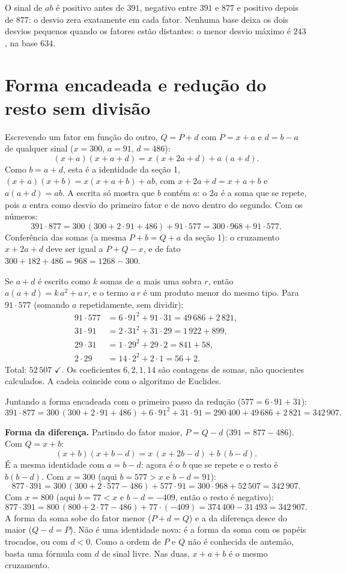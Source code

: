 \documentclass[11pt,a4paper]{article}
\newcommand{\N}{342\,907}
\begin{document}
O sinal de $ab$ é positivo antes de $391$, negativo entre $391$ e $877$ e positivo depois de $877$: o desvio zera exatamente em cada fator. Nenhuma base deixa os dois desvios pequenos quando os fatores estão distantes: o menor desvio máximo é $243$, na base $634$.

\section{Forma encadeada e redução do resto sem divisão}

Escrevendo um fator em função do outro, $Q=P+d$ com $P=x+a$ e $d=b-a$ de qualquer sinal ($x=300$, $a=91$, $d=486$):
\[
(x+a)(x+a+d) = x\,(x+2a+d) + a\,(a+d).
\]
Como $b=a+d$, esta é a identidade da seção 1, $(x+a)(x+b)=x(x+a+b)+ab$, com $x+2a+d=x+a+b$ e $a(a+d)=ab$. A escrita só mostra que $b$ contém $a$: o $2a$ é a soma que se repete, pois $a$ entra como desvio do primeiro fator e de novo dentro do segundo. Com os números:
\[
391\cdot 877 = 300\,(300+2\cdot 91+486) + 91\cdot 577 = 300\cdot 968 + 91\cdot 577 .
\]
Conferência das somas (a mesma $P+b=Q+a$ da seção 1): o cruzamento $x+2a+d$ deve ser igual a $P+Q-x$, e de fato $300+182+486 = 968 = 1268-300$.

Se $a+d$ é escrito como $k$ somas de $a$ mais uma sobra $r$, então $a(a+d)=k\,a^2+a\,r$, e o termo $a\,r$ é um produto menor do mesmo tipo. Para $91\cdot 577$ (somando $a$ repetidamente, sem dividir):
\begin{align*}
91\cdot 577 &= 6\cdot 91^2 + 91\cdot 31 = 49\,686 + 2\,821,\\
31\cdot 91  &= 2\cdot 31^2 + 31\cdot 29 = 1\,922 + 899,\\
29\cdot 31  &= 1\cdot 29^2 + 29\cdot 2 = 841 + 58,\\
2\cdot 29   &= 14\cdot 2^2 + 2\cdot 1 = 56 + 2 .
\end{align*}
Total: $52\,507$ $\checkmark$. Os coeficientes $6,2,1,14$ são contagens de somas, não quocientes calculados. A cadeia coincide com o algoritmo de Euclides.

Juntando a forma encadeada com o primeiro passo da redução ($577 = 6\cdot 91+31$):
\[
391\cdot 877 = 300\,(300+2\cdot 91+486) + 6\cdot 91^2 + 31\cdot 91
= 290\,400 + 49\,686 + 2\,821 = \N .
\]

\textbf{Forma da diferença.} Partindo do fator maior, $P=Q-d$ ($391=877-486$). Com $Q=x+b$:
\[
(x+b)(x+b-d) = x\,(x+2b-d) + b\,(b-d).
\]
É a mesma identidade com $a=b-d$: agora é o $b$ que se repete e o resto é $b(b-d)$. Com $x=300$ (aqui $b=577>x$ e $b-d=91$):
\[
877\cdot 391 = 300\,(300+2\cdot 577-486) + 577\cdot 91 = 300\cdot 968 + 52\,507 = \N .
\]
Com $x=800$ (aqui $b=77<x$ e $b-d=-409$, então o resto é negativo):
\[
877\cdot 391 = 800\,(800+2\cdot 77-486) + 77\cdot(-409) = 374\,400 - 31\,493 = \N .
\]
A forma da soma sobe do fator menor ($P+d=Q$) e a da diferença desce do maior ($Q-d=P$). Não é uma identidade nova: é a forma da soma com os papéis trocados, ou com $d<0$. Como a ordem de $P$ e $Q$ não é conhecida de antemão, basta uma fórmula com $d$ de sinal livre. Nas duas, $x+a+b$ é o mesmo cruzamento.
\end{document}
